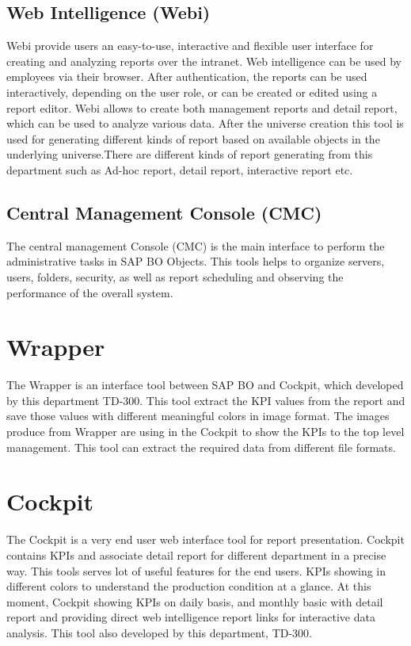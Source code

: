 \subsection{Web Intelligence (Webi)}
Webi provide users an easy-to-use, interactive and flexible user interface for creating and analyzing reports over the intranet. Web intelligence can be used by employees via their browser. After authentication, the reports can be used interactively, depending on the user role, or can be created or edited using a report editor. Webi allows to create both management reports and detail report, which can be used to analyze various data. After the universe creation this tool is used for generating different kinds of report based on available objects in the underlying universe.There are different kinds of report generating from this department such as Ad-hoc report, detail report, interactive report etc. 
\subsection{Central Management Console (CMC)}
The central management Console (CMC) is the main interface to perform the administrative tasks in SAP BO Objects. This tools helps to organize servers, users, folders, security, as well as report scheduling and observing the performance of the overall system.
\section{Wrapper}
The Wrapper is an interface tool between SAP BO and Cockpit, which developed by this department TD-300. This tool extract the KPI values from the report and save those values with different meaningful colors in image format. The images produce from Wrapper are using in the Cockpit to show the KPIs to the top level management. This tool can extract the required data from different file formats. \newpage

\section{Cockpit}
The Cockpit is a very end user web interface tool for report presentation. Cockpit contains KPIs and associate detail report for different department in a precise way. This tools serves lot of useful features for the end users. KPIs showing in different colors to understand the production condition at a glance. At this moment, Cockpit showing KPIs on daily basis, and monthly basic with detail report and providing direct web intelligence report links for interactive data analysis. This tool also developed by this department, TD-300.\\

